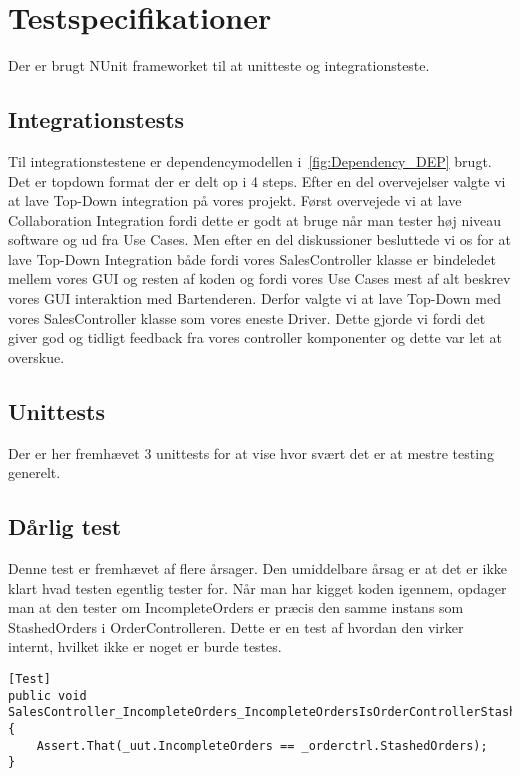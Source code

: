 \section{Testspecifikationer}

Der er brugt NUnit frameworket til at unitteste og integrationsteste. 

\subsection{Integrationstests}
Til integrationstestene er dependencymodellen i~\ref{fig:Dependency_DEP} brugt. Det er topdown format der er delt op i 4 steps. Efter en del overvejelser valgte vi at lave Top-Down integration på vores projekt. Først overvejede vi at lave Collaboration Integration fordi dette er godt at bruge når man tester høj niveau software og ud fra Use Cases. Men efter en del diskussioner besluttede vi os for at lave Top-Down Integration både fordi vores SalesController klasse er bindeledet mellem vores GUI og resten af koden og fordi vores Use Cases mest af alt beskrev vores GUI interaktion med Bartenderen. Derfor valgte vi at lave Top-Down med vores SalesController klasse som vores eneste Driver. Dette gjorde vi fordi det giver god og tidligt feedback fra vores controller komponenter og dette var let at overskue.


\subsection{Unittests}

Der er her fremhævet 3 unittests for at vise hvor svært det er at mestre testing generelt.

\subsection{Dårlig test}
Denne test er fremhævet af flere årsager. Den umiddelbare årsag er at det er ikke klart hvad testen egentlig tester for. Når man har kigget koden igennem, opdager man at den tester om IncompleteOrders er præcis den samme instans som StashedOrders i OrderControlleren. Dette er en test af hvordan den virker internt, hvilket ikke er noget er burde testes.
\begin{lstlisting}
[Test]
public void SalesController_IncompleteOrders_IncompleteOrdersIsOrderControllerStashedOrders()
{
    Assert.That(_uut.IncompleteOrders == _orderctrl.StashedOrders);
}
\end{lstlisting}	



